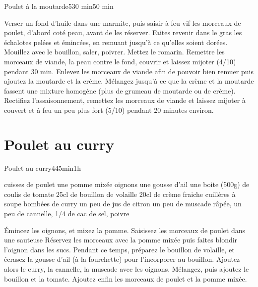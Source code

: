 {\begin{recette}{Poulet à la moutarde}{5}{30 min}{50 min}
\begin{preparation}
\etape Verser un fond d'huile dans une marmite, puis saisir à feu vif les morceaux de poulet, d'abord coté peau, avant de les réserver.
\etape Faites revenir dans le gras les échalotes pelées et émincées, en remuant jusqu'à ce qu'elles soient dorées.
\etape Mouillez avec le bouillon, saler, poivrer. Mettez le romarin. Remettre les morceaux de viande, la peau contre le fond, couvrir et laissez mijoter (4/10) pendant 30 min.
\etape Enlevez les morceaux de viande afin de pouvoir bien remuer puis ajoutez la moutarde et la crème. Mélangez 
jusqu'à ce que la crème et la moutarde fassent une mixture homogène (plus de grumeau de moutarde ou de crème). 
\etape Rectifiez l'assaisonnement, remettez les morceaux de viande et laissez mijoter à couvert et à feu un peu plus fort (5/10) pendant 20 minutes environ.
\end{preparation}
\end{recette}

\section{Poulet au curry}
\begin{recette}{Poulet au curry}{4}{45min}{1h}

\begin{ingredients}
 cuisses de poulet
\ingredient une pomme mixée
 oignons
\ingredient une gousse d'ail
\ingredient une boite (500g) de coulis de tomate
\ingredient 25cl de bouillon de volaille
\ingredient 20cl de crème fraiche
 cuillères à soupe bombées de curry
\ingredient un peu de jus de citron
\ingredient un peu de muscade râpée, un peu de cannelle, 1/4 de cac de sel, poivre
\end{ingredients}

\begin{preparation}
\etape Émincez les oignons, et mixez la pomme.
\etape Saisissez les morceaux de poulet dans une sauteuse
\etape Réservez les morceaux avec la pomme mixée puis faites blondir l'oignon dans les sucs.
\etape Pendant ce temps, préparez le bouillon de volaille, et écrasez la gousse d'ail (à la fourchette) pour l'incorporer au 
bouillon.
\etape Ajoutez alors le curry, la cannelle, la muscade avec les oignons. Mélangez, puis ajoutez le bouillon et la tomate. Ajoutez enfin les morceaux de poulet et la pomme mixée.
\end{preparation}


\end{recette}}
